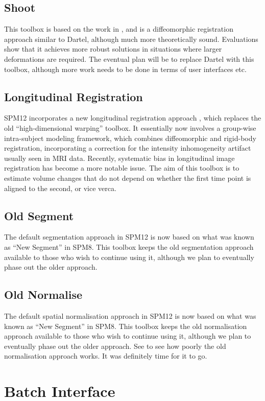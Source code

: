 \documentclass[a4paper,titlepage,openany]{article}
\begin{document}
\begin{multicols}{2}
\subsection{Shoot}
This toolbox is based on the work in \cite{ashburner2011diffeomorphic}, and is a diffeomorphic registration approach similar to Dartel, although much more theoretically sound.
Evaluations show that it achieves more robust solutions in situations where larger deformations are required.
The eventual plan will be to replace Dartel with this toolbox, although more work needs to be done in terms of user interfaces etc.

\subsection{Longitudinal Registration}
SPM12 incorporates a new longitudinal registration approach \cite{ashburner2013symmetric}, which replaces the old ``high-dimensional warping'' toolbox.
It essentially now involves a group-wise intra-subject modeling framework, which combines diffeomorphic \cite{ashburner2011diffeomorphic} and rigid-body registration, incorporating a correction for the intensity inhomogeneity artifact usually seen in MRI data.
Recently, systematic bias in longitudinal image registration has become a more notable issue.
The aim of this toolbox is to estimate volume changes that do not depend on whether the first time point is aligned to the second, or vice verca. 

\subsection{Old Segment}
The default segmentation approach in SPM12 is now based on what was known as ``New Segment'' in SPM8.
This toolbox keeps the old segmentation approach available to those who wish to continue using it, although we plan to eventually phase out the older approach.

\subsection{Old Normalise}
The default spatial normalisation approach in SPM12 is now based on what was known as ``New Segment'' in SPM8.
This toolbox keeps the old normalisation approach available to those who wish to continue using it, although we plan to eventually phase out the older approach.
See \cite{klein_evaluation} to see how poorly the old normalisation approach works.
It was definitely time for it to go.

\section{Batch Interface}




\end{multicols}
\end{document}
